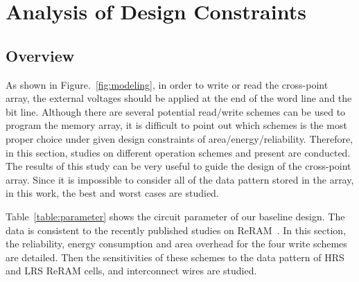 \vspace{10pt}
\section{Analysis of Design Constraints}\label{sec:w_and_r}

\subsection{Overview}
As shown in Figure.~\ref{fig:modeling}, in order to write or read the
cross-point array, the external voltages should be applied at the end of
the word line and the bit line. Although there are several potential
read/write schemes can be used to program the memory array, it is
difficult to point out which schemes is the most proper choice under given
design constraints of area/energy/reliability. Therefore, in this section,
studies on different operation schemes and present are conducted. The
results of this study can be very useful to guide the design of the cross-point array. Since it is impossible to consider all of the data pattern
stored in the array, in this work, the best and worst cases are studied.

Table~\ref{table:parameter} shows the circuit parameter of our baseline
design. The data is consistent to the recently published studies on
ReRAM~\cite{crossbar_TED_2010}\cite{memristor:Cong}. In this section, the
reliability, energy consumption and area overhead for the four write
schemes are detailed. Then the sensitivities of these schemes to the data
pattern of HRS and LRS ReRAM cells, and interconnect wires are studied.

